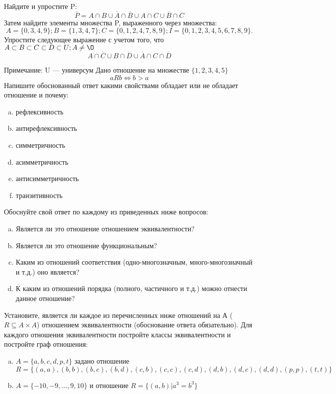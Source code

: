 \documentclass[10pt]{exam}
\begin{document}
\begin{questions}
\question
Найдите и упростите P:
\begin{equation*}
\overline{P} = A \cap B \cup \overline{A} \cap \overline{B} \cup A \cap C \cup \overline{B} \cap C
\end{equation*}
Затем найдите элементы множества P, выраженного через множества:
\begin{equation*}
A = \{0, 3, 4, 9\}; 
B = \{1, 3, 4, 7\};
C = \{0, 1, 2, 4, 7, 8, 9\};
I = \{0, 1, 2, 3, 4, 5, 6, 7, 8, 9\}.
\end{equation*}\question
Упростите следующее выражение с учетом того, что $A\subset B \subset C \subset D \subset U; A \neq \O$
\begin{equation*}
A \cap  \overline{C} \cup B \cap \overline{D} \cup  \overline{A} \cap C \cap  \overline{D}
\end{equation*}

Примечание: U — универсум\question
Дано отношение на множестве $\{1, 2, 3, 4, 5\}$ 
\begin{equation*}
aRb \iff b > a
\end{equation*}
Напишите обоснованный ответ какими свойствами обладает или не обладает отношение и почему:   
\begin{enumerate} [a)]\setcounter{enumi}{0}
\item рефлексивность
\item антирефлексивность
\item симметричность
\item асимметричность
\item антисимметричность
\item транзитивность
\end{enumerate}

Обоснуйте свой ответ по каждому из приведенных ниже вопросов:
\begin{enumerate} [a)]\setcounter{enumi}{0}
    \item Является ли это отношение отношением эквивалентности?
    \item Является ли это отношение функциональным?
    \item Каким из отношений соответствия (одно-многозначным, много-многозначный и т.д.) оно является?
    \item К каким из отношений порядка (полного, частичного и т.д.) можно отнести данное отношение?
\end{enumerate}

\question
Установите, является ли каждое из перечисленных ниже отношений на А ($R \subseteq A \times A$) отношением эквивалентности (обоснование ответа обязательно). Для каждого отношения эквивалентности постройте классы 
эквивалентности и постройте граф отношения:
\begin{enumerate} [a)]\setcounter{enumi}{0}
\item $A = \{a, b, c, d, p, t\}$ задано отношение $R = \{(a, a), (b, b), (b, c), (b, d), (c, b), (c, c), (c, d), (d, b), (d, c), (d, d), (p,p), (t,t)\}$
\item $A = \{-10, -9, … , 9, 10\}$ и отношение $R = \{(a,b)|a^{3} = b^{3}\}$


\end{enumerate}
\end{questions}
\end{document}
